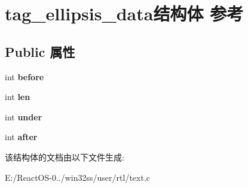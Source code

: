 \hypertarget{structtag__ellipsis__data}{}\section{tag\+\_\+ellipsis\+\_\+data结构体 参考}
\label{structtag__ellipsis__data}
\subsection*{Public 属性}
\begin{DoxyCompactItemize}
\item 
\mbox{\label{structtag__ellipsis__data_a6f58dff74f9f20dded957f74d00ca5aa}} 
int {\bfseries before}
\item 
\mbox{\label{structtag__ellipsis__data_a26eb144424ec80706f7311b0398ac828}} 
int {\bfseries len}
\item 
\mbox{\label{structtag__ellipsis__data_a4ca729efbd91fe24470bc0cb27aa64de}} 
int {\bfseries under}
\item 
\mbox{\label{structtag__ellipsis__data_ab9c98f533e1111b050005ece242c7109}} 
int {\bfseries after}
\end{DoxyCompactItemize}


该结构体的文档由以下文件生成\+:\begin{DoxyCompactItemize}
\item 
E\+:/\+React\+O\+S-\/0../win32ss/user/rtl/text.\+c\end{DoxyCompactItemize}
